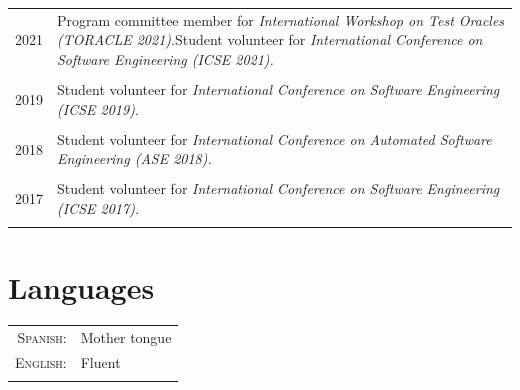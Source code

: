 \documentclass[a4paper,10pt]{article} %
\begin{document}
\begin{longtable}{>{\raggedleft\arraybackslash}p{} p{}}
\textsc{2021} & Program committee member for \textit{International Workshop on Test Oracles (TORACLE 2021)}.Student volunteer for \textit{International Conference on Software Engineering (ICSE 2021).} \\ & \\

\textsc{2019} & Student volunteer for \textit{International Conference on Software Engineering (ICSE 2019).} \\ & \\ 

\textsc{2018} & Student volunteer for \textit{International Conference on Automated Software Engineering (ASE 2018).} \\ & \\ 

\textsc{2017} & Student volunteer for \textit{International Conference on Software Engineering (ICSE 2017).} \\ & \\ 

\end{longtable}

\section{Languages}
\begin{tabular}{rl}
\\
\textsc{Spanish:} & Mother tongue\\
\textsc{English:} & Fluent \\ & \\
\end{tabular}
\end{document}
